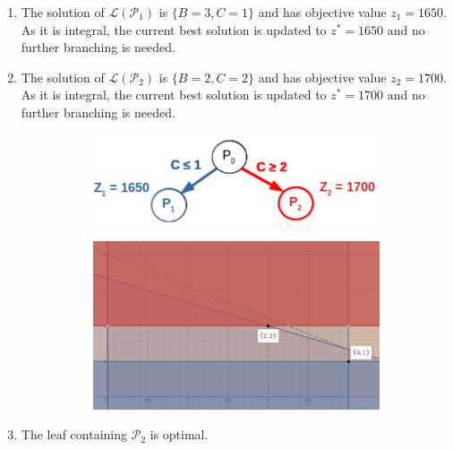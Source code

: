 \begin{example}
\begin{enumerate}
        \item The solution of $\mathcal{L}(\mathcal{P}_1)$ is $\{ B=3, C=1 \}$ and has objective value $z_1 = 1650$. 
            As it is integral, the current best solution is updated to $z^* = 1650$ and no further branching is needed.

        \item The solution of $\mathcal{L}(\mathcal{P}_2)$ is $\{ B=2, C=2 \}$ and has objective value $z_2 = 1700$. 
            As it is integral, the current best solution is updated to $z^* = 1700$ and no further branching is needed.
            \begin{figure}[H]
                \centering
                \begin{subfigure}{0.35\linewidth}
                    \centering
                    \includegraphics[width=\linewidth]{./img/bakery_tree3.png}
                \end{subfigure}
                \begin{subfigure}{0.55\linewidth}
                    \centering
                    \includegraphics[width=\linewidth]{./img/bakery_3.png}
                \end{subfigure}
            \end{figure}

        \item The leaf containing $\mathcal{P}_2$ is optimal.
    \end{enumerate}
\end{example}


